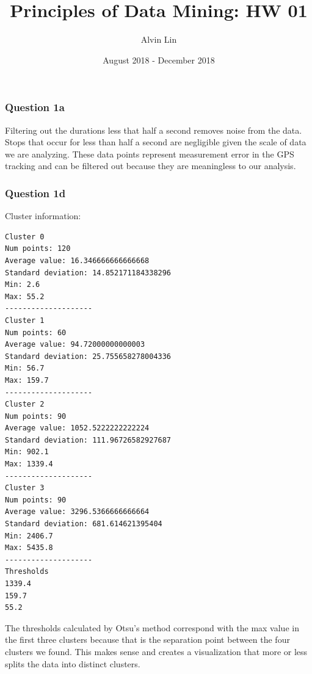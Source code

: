 \documentclass{math}
\title{Principles of Data Mining: HW 01}
\author{Alvin Lin}
\date{August 2018 - December 2018}
\begin{document}
\maketitle

\subsubsection*{Question 1a}
Filtering out the durations less that half a second removes noise from the data.
Stops that occur for less than half a second are negligible given the scale of
data we are analyzing. These data points represent measurement error in the GPS
tracking and can be filtered out because they are meaningless to our analysis.

\subsubsection*{Question 1d}
Cluster information:
\begin{lstlisting}
Cluster 0
Num points: 120
Average value: 16.346666666666668
Standard deviation: 14.852171184338296
Min: 2.6
Max: 55.2
--------------------
Cluster 1
Num points: 60
Average value: 94.72000000000003
Standard deviation: 25.755658278004336
Min: 56.7
Max: 159.7
--------------------
Cluster 2
Num points: 90
Average value: 1052.5222222222224
Standard deviation: 111.96726582927687
Min: 902.1
Max: 1339.4
--------------------
Cluster 3
Num points: 90
Average value: 3296.5366666666664
Standard deviation: 681.614621395404
Min: 2406.7
Max: 5435.8
--------------------
Thresholds
1339.4
159.7
55.2
\end{lstlisting}
The thresholds calculated by Otsu's method correspond with the max value in the
first three clusters because that is the separation point between the four
clusters we found. This makes sense and creates a visualization that more or
less splits the data into distinct clusters.
\end{document}
